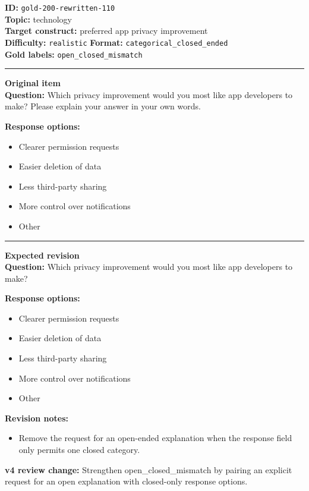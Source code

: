 \documentclass[10pt,a4paper]{article}
\newcommand{\sectionline}{\vspace{0.15em}\hrule\vspace{0.35em}}
\begin{document}
\begin{tcolorbox}[colframe=FlawRed,colback=white,colbacktitle=FlawRed!9,coltitle=black,title={Item 110\hfill Flawed item}]
\textbf{ID:} \texttt{gold-200-rewritten-110}\\
\textbf{Topic:} technology\\
\textbf{Target construct:} preferred app privacy improvement\\
\textbf{Difficulty:} \texttt{realistic} \quad \textbf{Format:} \texttt{categorical\_closed\_ended}\\
\textbf{Gold labels:} \texttt{open\_closed\_mismatch}\\
\sectionline
\textbf{Original item}\\
\textbf{Question:} Which privacy improvement would you most like app developers to make? Please explain your answer in your own words.
\par\textbf{Response options:}
\begin{itemize}
\item Clearer permission requests
\item Easier deletion of data
\item Less third-party sharing
\item More control over notifications
\item Other
\end{itemize}
\sectionline
\textbf{Expected revision}\\
\textbf{Question:} Which privacy improvement would you most like app developers to make?
\par\textbf{Response options:}
\begin{itemize}
\item Clearer permission requests
\item Easier deletion of data
\item Less third-party sharing
\item More control over notifications
\item Other
\end{itemize}
\par\textbf{Revision notes:}
\begin{itemize}
\item Remove the request for an open-ended explanation when the response field only permits one closed category.
\end{itemize}
\par\textbf{v4 review change:} Strengthen open\_closed\_mismatch by pairing an explicit request for an open explanation with closed-only response options.
\end{tcolorbox}
\end{document}
